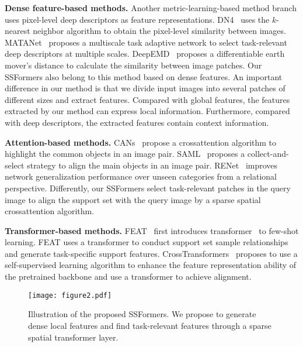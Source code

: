 \documentclass{SCIS2019}
\begin{document}
\textbf{Dense feature-based methods.} Another metric-learning-based method branch uses pixel-level deep descriptors as feature representations. DN4~\cite{9} uses the $k$-nearest neighbor algorithm to obtain the pixel-level similarity between images. MATANet~\cite{12} proposes a multiscale task adaptive network to select task-relevant deep descriptors at multiple scales. DeepEMD~\cite{13} proposes a differentiable earth mover's distance to calculate the similarity between image patches. Our SSFormers also belong to this method based on dense features. An important difference in our method is that we divide input images into several patches of different sizes and extract features. Compared with global features, the features extracted by our method can express local information. Furthermore, compared with deep descriptors, the extracted features contain context information.

\textbf{Attention-based methods.} CANs~\cite{14} propose a crossattention algorithm to highlight the common objects in an image pair. SAML~\cite{15} proposes a collect-and-select strategy to align the main objects in an image pair. RENet~\cite{10} improves network generalization performance over unseen categories from a relational perspective. Differently, our SSFormers select task-relevant patches in the query image to align the support set with the query image by a sparse spatial crossattention algorithm.

\textbf{Transformer-based methods.} FEAT~\cite{19} first introduces transformer~\cite{20} to few-shot learning. FEAT uses a transformer to conduct support set sample relationships and generate task-specific support features. CrossTransformers~\cite{21} proposes to use a self-supervised learning algorithm to enhance the feature representation ability of the pretrained backbone and use a transformer to achieve alignment.

\begin{figure*}[t]
	\centering
	\texttt{[image: figure2.pdf]} \caption{Illustration of the proposed SSFormers. We propose to generate dense local features and find task-relevant features through a sparse spatial transformer layer.}
	\label{fig2}
\end{figure*}
\end{document}
